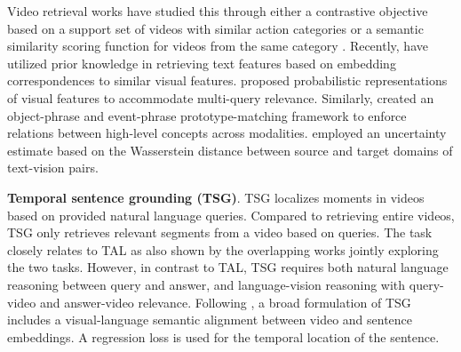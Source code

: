 

Video retrieval works have studied this through either a contrastive objective based on a support set of videos with similar action categories \citep{patrick2020support} or a semantic
similarity scoring function for videos from the same category \citep{wray2021semantic}. Recently, \citet{kim2024you} have utilized prior knowledge in retrieving text features based on embedding correspondences to similar visual features. \citet{chun2021probabilistic} proposed probabilistic representations of visual features to accommodate multi-query relevance. Similarly, \citet{li2023progressive} created an object-phrase and event-phrase prototype-matching framework to enforce relations between high-level concepts across modalities. \citet{hao2024uncertainty} employed an uncertainty estimate based on the Wasserstein distance between source and target domains of text-vision pairs.




\noindent
\textbf{Temporal sentence grounding (TSG)}. TSG \citep{regneri2013grounding} localizes moments in videos based on provided natural language queries. Compared to retrieving entire videos, TSG only retrieves relevant segments from a video based on queries. The task closely relates to TAL as also shown by the overlapping works \citep{gao2017tall} jointly exploring the two tasks. However, in contrast to TAL, TSG requires both natural language reasoning between query and answer, and language-vision reasoning with query-video and answer-video relevance. Following \citet{gao2017tall}, a broad formulation of TSG includes a visual-language semantic alignment between video and sentence embeddings. A regression loss is used for the temporal location of the sentence.


